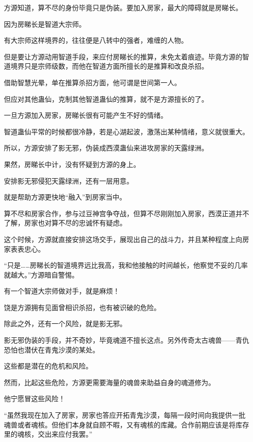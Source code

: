 
\begin{this_body}



方源知道，算不尽的身份毕竟只是伪装。要加入房家，最大的障碍就是房睇长。

因为房睇长是智道大宗师。

有大宗师这样境界的，往往便是八转中的强者，难缠的人物。

但是要让方源动用智道手段，来应付房睇长的推算，未免太着痕迹。毕竟方源的智道境界只是宗师级数，而他在智道方面所擅长的是推算和改良杀招。

借助智慧光晕，单在推算杀招方面，他可谓是世间第一人。

但应对其他蛊仙，克制其他智道蛊仙的推算，就不是方源擅长的了。

一旦方源加入房家，房睇长很有可能产生不好的情绪。

智道蛊仙平常的时候都很冷静，若是心湖起波，激荡出某种情绪，意义就很重大。

所以，方源安排了影无邪，伪装成西漠蛊仙来进攻房家的天露绿洲。

果然，房睇长中计，没有怀疑到方源的身上。

安排影无邪侵犯天露绿洲，还有一层用意。

就是帮助方源更快地“融入”到房家当中。

算不尽和房家合作，参与过豆神宫争夺战，但算不尽刚刚加入房家，西漠正道并不了解，房家也对算不尽的忠诚怀有疑虑。

这个时候，方源就直接安排这场交手，展现出自己的战斗力，并且某种程度上向房家表表忠心。

“只是……房睇长的智道境界远比我高，我和他接触的时间越长，他察觉不妥的几率就越大。”方源暗自警惕。

有一个智道大宗师做对手，就是麻烦！

饶是方源拥有见面曾相识杀招，也有被识破的危险。

除此之外，还有一个风险，就是影无邪。

影无邪伪装的手段，并不奇妙，毕竟魂道不擅长这点。另外传奇太古魂兽——青仇恐怕也潜伏在青鬼沙漠的某处。

这些都是潜在的危机和风险。

然而，比起这些危险，方源更需要海量的魂兽来助益自身的魂道修为。

他宁愿冒这些风险！

“虽然我现在加入了房家，房家也答应开拓青鬼沙漠，每隔一段时间向我提供一批魂兽或者魂核。但他们本身就自顾不暇，又有魂核的库藏。合作前期应该是将库存里的魂核，交出来应付我罢。”


\end{this_body}
